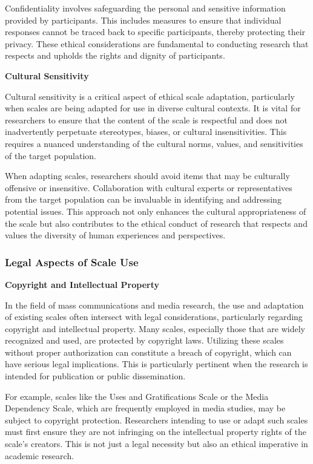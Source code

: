 \documentclass[
]{book}
\begin{document}
Confidentiality involves safeguarding the personal and sensitive information provided by participants. This includes measures to ensure that individual responses cannot be traced back to specific participants, thereby protecting their privacy. These ethical considerations are fundamental to conducting research that respects and upholds the rights and dignity of participants.

\textbf{Cultural Sensitivity}

Cultural sensitivity is a critical aspect of ethical scale adaptation, particularly when scales are being adapted for use in diverse cultural contexts. It is vital for researchers to ensure that the content of the scale is respectful and does not inadvertently perpetuate stereotypes, biases, or cultural insensitivities. This requires a nuanced understanding of the cultural norms, values, and sensitivities of the target population.

When adapting scales, researchers should avoid items that may be culturally offensive or insensitive. Collaboration with cultural experts or representatives from the target population can be invaluable in identifying and addressing potential issues. This approach not only enhances the cultural appropriateness of the scale but also contributes to the ethical conduct of research that respects and values the diversity of human experiences and perspectives.

\hypertarget{legal-aspects-of-scale-use}{%
\subsubsection*{Legal Aspects of Scale Use}\label{legal-aspects-of-scale-use}}

\textbf{Copyright and Intellectual Property}

In the field of mass communications and media research, the use and adaptation of existing scales often intersect with legal considerations, particularly regarding copyright and intellectual property. Many scales, especially those that are widely recognized and used, are protected by copyright laws. Utilizing these scales without proper authorization can constitute a breach of copyright, which can have serious legal implications. This is particularly pertinent when the research is intended for publication or public dissemination.

For example, scales like the Uses and Gratifications Scale or the Media Dependency Scale, which are frequently employed in media studies, may be subject to copyright protection. Researchers intending to use or adapt such scales must first ensure they are not infringing on the intellectual property rights of the scale's creators. This is not just a legal necessity but also an ethical imperative in academic research.
\end{document}
